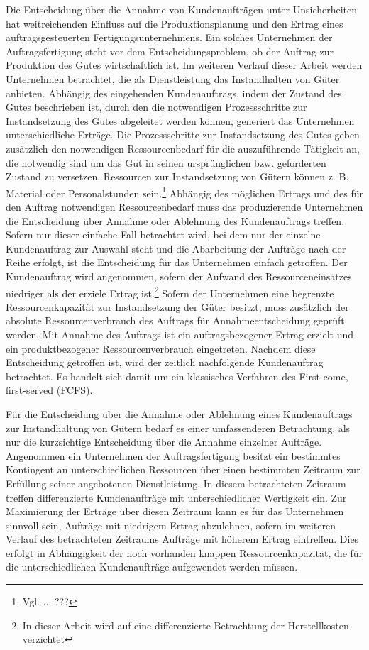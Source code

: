 Die Entscheidung über die Annahme von Kundenaufträgen unter Unsicherheiten hat weitreichenden Einfluss auf die Produktionsplanung und den Ertrag eines auftragsgesteuerten Fertigungsunternehmens. Ein solches Unternehmen der Auftragsfertigung steht vor dem Entscheidungsproblem, ob der Auftrag zur Produktion des Gutes wirtschaftlich ist. Im weiteren Verlauf dieser Arbeit werden Unternehmen betrachtet, die als Dienstleistung das Instandhalten von Güter anbieten. Abhängig des eingehenden Kundenauftrags, indem der Zustand des Gutes beschrieben ist, durch den die notwendigen Prozessschritte zur Instandsetzung des Gutes abgeleitet werden können, generiert das Unternehmen unterschiedliche Erträge. Die Prozessschritte zur Instandsetzung des Gutes geben zusätzlich den notwendigen Ressourcenbedarf für die auszuführende Tätigkeit an, die notwendig sind um das Gut in seinen ursprünglichen bzw. geforderten Zustand zu versetzen. Ressourcen zur Instandsetzung von Gütern können z. B. Material oder Personalstunden sein.\footnote{Vgl. ... ???} Abhängig des möglichen Ertrags und des für den Auftrag notwendigen Ressourcenbedarf muss das produzierende Unternehmen die Entscheidung über Annahme oder Ablehnung des Kundenauftrags treffen. Sofern nur dieser einfache Fall betrachtet wird, bei dem nur der einzelne Kundenauftrag zur Auswahl steht und die Abarbeitung der Aufträge nach der Reihe erfolgt, ist die Entscheidung für das Unternehmen einfach getroffen. Der Kundenauftrag wird angenommen, sofern der Aufwand des Ressourceneinsatzes niedriger als der erziele Ertrag ist.\footnote{In dieser Arbeit wird auf eine differenzierte Betrachtung der Herstellkosten verzichtet}
Sofern der Unternehmen eine begrenzte Ressourcenkapazität zur Instandsetzung der Güter besitzt, muss zusätzlich der absolute Ressourcenverbrauch des Auftrags für Annahmeentscheidung geprüft werden. Mit Annahme des Auftrags ist ein auftragsbezogener Ertrag erzielt und ein produktbezogener Ressourcenverbrauch eingetreten. Nachdem diese Entscheidung getroffen ist, wird der zeitlich nachfolgende Kundenauftrag betrachtet. Es handelt sich damit um ein klassisches Verfahren des \glqq First-come, first-served (FCFS){\grqq}.

Für die Entscheidung über die Annahme oder Ablehnung eines Kundenauftrags zur Instandhaltung von Gütern bedarf es einer umfassenderen Betrachtung, als nur die kurzsichtige Entscheidung über die Annahme einzelner Aufträge. Angenommen ein Unternehmen der Auftragsfertigung besitzt ein bestimmtes Kontingent an unterschiedlichen Ressourcen über einen bestimmten Zeitraum zur Erfüllung seiner angebotenen Dienstleistung. In diesem betrachteten Zeitraum treffen differenzierte Kundenaufträge mit unterschiedlicher Wertigkeit ein. Zur Maximierung der Erträge über diesen Zeitraum kann es für das Unternehmen sinnvoll sein, Aufträge mit niedrigem Ertrag abzulehnen, sofern im weiteren Verlauf des betrachteten Zeitraums Aufträge mit höherem Ertrag eintreffen. Dies erfolgt in Abhängigkeit der noch vorhanden knappen Ressourcenkapazität, die für die unterschiedlichen Kundenaufträge aufgewendet werden müssen.


